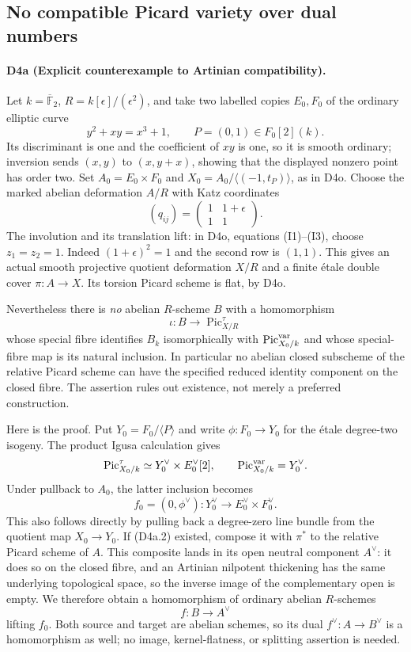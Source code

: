 \subsection{No compatible Picard variety over dual numbers}
\paragraph{D4a (Explicit counterexample to Artinian compatibility).}
Let $k=\overline{\mathbb F}_2$, $R=k[\epsilon]/(\epsilon^2)$,
and take two labelled copies $E_0,F_0$ of the ordinary elliptic
curve
\[
 y^2+xy=x^3+1,
 \qquad P=(0,1)\in F_0[2](k).
\]
Its discriminant is one and the coefficient of $xy$ is one, so it
is smooth ordinary; inversion sends $(x,y)$ to $(x,y+x)$,
showing that the displayed nonzero point has order two.
Set $A_0=E_0\times F_0$ and
$X_0=A_0/\langle(-1,t_P)\rangle$, as in D4o.
Choose the marked abelian deformation $A/R$ with Katz coordinates
\[
 (q_{ij})=\begin{pmatrix}1&1+\epsilon\\1&1\end{pmatrix}.
                                                        \tag{D4a.1}
\]
The involution and its translation lift: in D4o, equations
(I1)--(I3), choose $z_1=z_2=1$. Indeed
$(1+\epsilon)^2=1$ and the second row is $(1,1)$.
This gives an actual smooth projective quotient deformation
$X/R$ and a finite étale double cover $\pi:A\to X$.
Its torsion Picard scheme is flat, by D4o.

Nevertheless there is \emph{no} abelian $R$-scheme $B$ with a
homomorphism
\[
 \iota:B\longrightarrow\operatorname{Pic}^{\tau}_{X/R}
                                                        \tag{D4a.2}
\]
whose special fibre identifies $B_k$ isomorphically with
$\operatorname{Pic}^{\rm var}_{X_0/k}$ and whose special-fibre
map is its natural inclusion. In particular no abelian closed
subscheme of the relative Picard scheme can have the specified
reduced identity component on the closed fibre. The assertion
rules out existence, not merely a preferred construction.

Here is the proof. Put $Y_0=F_0/\langle P\rangle$ and write
$\phi:F_0\to Y_0$ for the étale degree-two isogeny. The product
Igusa calculation gives
\[
 \operatorname{Pic}^{\tau}_{X_0/k}
     \simeq Y_0^\vee\times E_0^\vee[2],
 \qquad \operatorname{Pic}^{\rm var}_{X_0/k}=Y_0^\vee.
\]
Under pullback to $A_0$, the latter inclusion becomes
\[
 f_0=(0,\phi^\vee):Y_0^\vee
                         \longrightarrow E_0^\vee\times F_0^\vee.
                                                        \tag{D4a.3}
\]
This also follows directly by pulling back a degree-zero line
bundle from the quotient map $X_0\to Y_0$.
If (D4a.2) existed, compose it with $\pi^*$ to the relative
Picard scheme of $A$. This composite lands in its open neutral
component $A^\vee$: it does so on the closed fibre, and an
Artinian nilpotent thickening has the same underlying topological
space, so the inverse image of the complementary open is empty.
We therefore obtain a homomorphism of ordinary abelian $R$-schemes
\[
 f:B\longrightarrow A^\vee
\]
lifting $f_0$. Both source and target are abelian schemes, so its
dual $f^\vee:A\to B^\vee$ is a homomorphism as well; no image,
kernel-flatness, or splitting assertion is needed.

